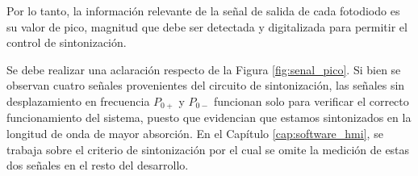 Por lo tanto, la información relevante de la señal de salida de cada fotodiodo es su valor de pico, magnitud que debe ser detectada y digitalizada para permitir el control de sintonización.

Se debe realizar una aclaración respecto de la Figura \ref{fig:senal_pico}. Si bien se observan cuatro señales provenientes del circuito de sintonización, las señales sin desplazamiento en frecuencia $P_{0+}$ y $P_{0-}$ funcionan solo para verificar el correcto funcionamiento del sistema, puesto que evidencian que estamos sintonizados en la longitud de onda de mayor absorción. En el Capítulo \ref{cap:software_hmi}, se trabaja sobre el criterio de sintonización por el cual se omite la medición de estas dos señales en el resto del desarrollo.